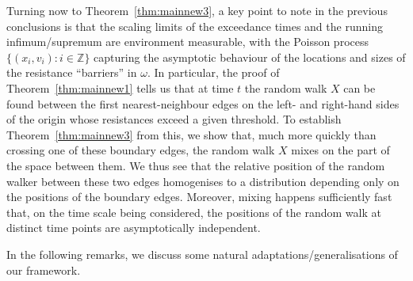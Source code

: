 \documentclass[AHL,Unicode,longabstracts,published]{cedram}
\newcommand{\Z}{\mathbb Z}
\begin{document}
Turning now to Theorem~\ref{thm:mainnew3}, a key point to note in the previous conclusions is that the scaling limits of the exceedance times and the running infimum/supremum are environment measurable, with the Poisson process $\{(x_i,v_i):i\in\Z\}$ capturing the asymptotic behaviour of the locations and sizes of the resistance ``barriers'' in $\omega$. In particular, the proof of Theorem~\ref{thm:mainnew1} tells us that at time $t$ the random walk $X$ can be found between the first nearest-neighbour edges on the left- and right-hand sides of the origin whose resistances exceed a given threshold. To establish Theorem~\ref{thm:mainnew3} from this, we show that, much more quickly than crossing one of these boundary edges, the random walk $X$ mixes on the part of the space between them. We thus see that the relative position of the random walker between these two edges homogenises to a distribution depending only on the positions of the boundary edges. Moreover, mixing happens sufficiently fast that, on the time scale being considered, the positions of the random walk at distinct time points are asymptotically independent.

In the following remarks, we discuss some natural adaptations/generalisations of our framework.
\end{document}
